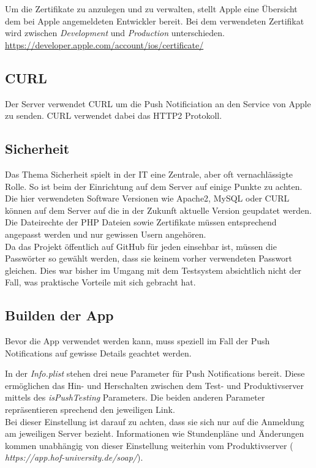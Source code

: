 Um die Zertifikate zu anzulegen und zu verwalten, stellt Apple eine Übersicht dem bei Apple angemeldeten Entwickler bereit. Bei dem verwendeten Zertifikat wird zwischen \textit{Development} und \textit{Production} unterschieden.\\
\url{https://developer.apple.com/account/ios/certificate/}


\subsection{CURL}
Der Server verwendet CURL um die Push Notificiation an den Service von Apple zu senden.  
CURL verwendet dabei das HTTP2 Protokoll.

\textcolor{black}{

}


\subsection{Sicherheit}
Das Thema Sicherheit spielt in der IT eine Zentrale, aber oft vernachlässigte Rolle. So ist beim der Einrichtung auf dem Server auf einige Punkte zu achten. Die hier verwendeten Software Versionen wie Apache2, MySQL oder CURL können auf dem Server auf die in der Zukunft aktuelle Version geupdatet werden.
Die Dateirechte der PHP Dateien sowie Zertifikate müssen entsprechend angepasst werden und nur gewissen Usern angehören.\\
Da das Projekt öffentlich auf GitHub für jeden einsehbar ist, müssen die Passwörter so gewählt werden, dass sie keinem vorher verwendeten Passwort gleichen. Dies war bisher im Umgang mit dem Testsystem absichtlich nicht der Fall, was praktische Vorteile mit sich gebracht hat.

\newpage

\subsection{Builden der App}
Bevor die App verwendet werden kann, muss speziell im Fall der Push Notifications auf gewisse Details geachtet werden.


In der \textit{Info.plist} stehen drei neue Parameter für Push Notifications bereit. Diese ermöglichen das Hin- und Herschalten zwischen dem Test- und Produktivserver mittels des \textit{isPushTesting} Parameters. Die beiden anderen Parameter repräsentieren sprechend den jeweiligen Link.\\
Bei dieser Einstellung ist darauf zu achten, dass sie sich nur auf die Anmeldung am jeweiligen Server bezieht. Informationen wie Stundenpläne und Änderungen kommen unabhängig von dieser Einstellung weiterhin vom Produktivserver (\textit{ https://app.hof-university.de/soap/}).

